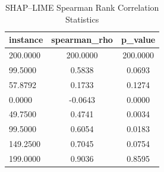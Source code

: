 \begin{table}
\centering
\caption{SHAP–LIME Spearman Rank Correlation Statistics}
\label{tab:agreement}
\begin{tabular}{lcc}
\toprule
instance & spearman_rho & p_value \\
\midrule
200.0000 & 200.0000 & 200.0000 \\
99.5000 & 0.5838 & 0.0693 \\
57.8792 & 0.1733 & 0.1274 \\
0.0000 & -0.0643 & 0.0000 \\
49.7500 & 0.4741 & 0.0034 \\
99.5000 & 0.6054 & 0.0183 \\
149.2500 & 0.7045 & 0.0754 \\
199.0000 & 0.9036 & 0.8595 \\
\bottomrule
\end{tabular}
\end{table}
